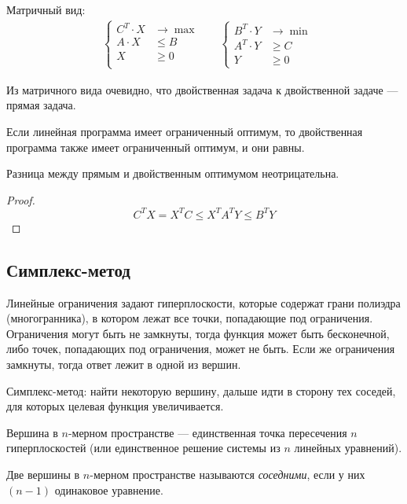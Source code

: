 Матричный вид:
\begin{align*}
    &
    \left\{
        \begin{aligned}
            C^T \cdot X & \to \max \\
            A \cdot X & \le B \\
            X & \ge 0 \\
        \end{aligned}
    \right.
    &&
    \left\{
        \begin{aligned}
            B^T \cdot Y & \to \min \\
            A^T \cdot Y & \ge C \\
            Y & \ge 0
        \end{aligned}
    \right.
\end{align*}

Из матричного вида очевидно,
что двойственная задача к двойственной задаче
--- прямая задача.

\begin{theorem}
    Если линейная программа имеет ограниченный
    оптимум, то двойственная программа также
    имеет ограниченный оптимум,
    и они равны.
\end{theorem}

\begin{theorem}
    Разница между прямым и двойственным оптимумом
    неотрицательна.
\end{theorem}
\begin{proof}
    \[
        C^T X = X^T C \le X^T A^T Y \le B^T Y
    \]
\end{proof}

\subsection{Симплекс-метод}
Линейные ограничения задают гиперплоскости,
которые содержат грани полиэдра (многогранника),
в котором лежат все точки, попадающие под ограничения.
Ограничения могут быть не замкнуты,
тогда функция может быть бесконечной,
либо точек, попадающих под ограничения,
может не быть.
Если же ограничения замкнуты,
тогда ответ лежит в одной из вершин.

Симплекс-метод:
найти некоторую вершину,
дальше идти в сторону тех соседей,
для которых целевая функция увеличивается.

\begin{definition}
    Вершина в $n$-мерном пространстве
    --- единственная точка пересечения $n$ гиперплоскостей
    (или единственное решение системы из $n$ линейных уравнений).
\end{definition}
\begin{definition}
    Две вершины в $n$-мерном пространстве называются \emph{соседними},
    если у них $(n - 1)$ одинаковое уравнение.
\end{definition}

